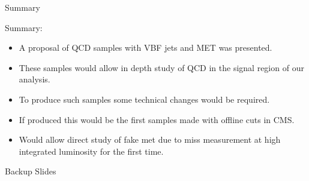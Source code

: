 \documentclass[8pt]{beamer}
\begin{document}
\begin{frame}{Summary}
 
\begin{block}{Summary:}
 
\begin{itemize}
  \item A proposal of QCD samples with VBF jets and MET was presented.
  \item These samples would allow in depth study of QCD in the signal region of our analysis.
  \item To produce such samples some technical changes would be required.
  \item If produced this would be the first samples made with offline cuts in CMS.
  \item Would allow direct study of fake met due to miss measurement at high integrated luminosity for the first time.
\end{itemize}

\end{block}

\end{frame}

\appendix
\begin{frame}
 
\begin{block}

\begin{center}Backup Slides\end{center}

\end{block}

\end{frame}
\end{document}
